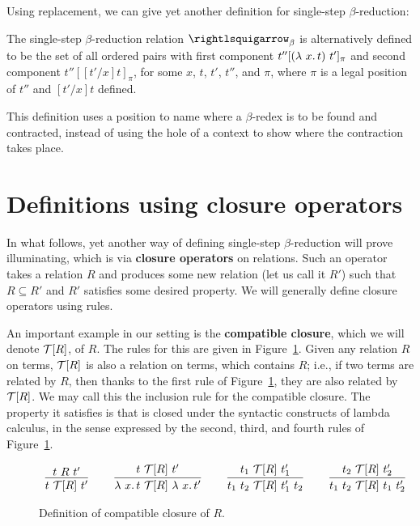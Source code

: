Using replacement, we can give yet another definition for single-step $\beta$-reduction:

\begin{definition}
\label{def:betapos}
The single-step $\beta$-reduction relation
$\betar$ is alternatively defined to be the set of all ordered pairs with first component $t''[(\lambda\ x.\, t)\ t']_\pi$
and second component $t''[[t'/x]t]_\pi$, for some $x$, $t$, $t'$, $t''$, and $\pi$, where $\pi$ is a legal position of $t''$
and $[t'/x]t$ defined.
\end{definition}

This definition uses a position to name where a $\beta$-redex is to be found and contracted, instead of using the hole of a context
to show where the contraction takes place.

\section{Definitions using closure operators}
\label{sec:clos}

In what follows, yet another way of defining single-step
$\beta$-reduction will prove illuminating, which is via
\textbf{closure operators} on relations.
Such an operator takes a relation $R$ and produces some new relation (let us
call it $R'$) such that $R\subseteq R'$ and $R'$ satisfies some desired property.
We will generally define closure operators using rules.

An important example in our setting is the \textbf{compatible closure},
which we will denote
$\mathcal{T}[R]$, of $R$.  The rules for this are
given in Figure~\ref{fig:compcl}.  Given any relation $R$ on terms,
$\mathcal{T}[R]$ is also a relation on terms, which contains $R$; i.e., if
two terms are related by $R$, then thanks to the first rule of
Figure~\ref{fig:compcl}, they are also related by $\mathcal{T}[R]$.  We may
call this the inclusion rule for the compatible closure. 
The property it satisfies is that is closed under the syntactic constructs
of lambda calculus, in the sense expressed by the second, third, and
fourth rules of Figure~\ref{fig:compcl}.


\begin{figure}
  \[
  \begin{array}{lllllll}
\infer{t\ \Tau[R]\ t'}{t\ R\ t' } & \ &
\infer{\lam{x}{t}\ \Tau[R]\ \lam{x}{t'}}{t\ \Tau[R]\ t'} & \ &
\infer{t_1\ t_2\ \Tau[R]\ t_1'\ t_2}{t_1\ \Tau[R]\ t_1'} &\ &
\infer{t_1\ t_2\ \Tau[R]\ t_1\ t_2'}{t_2\ \Tau[R]\ t_2'}
  \end{array}
  \]
  \caption{Definition of compatible closure of $R$.}
  \label{fig:compcl}
\end{figure}

